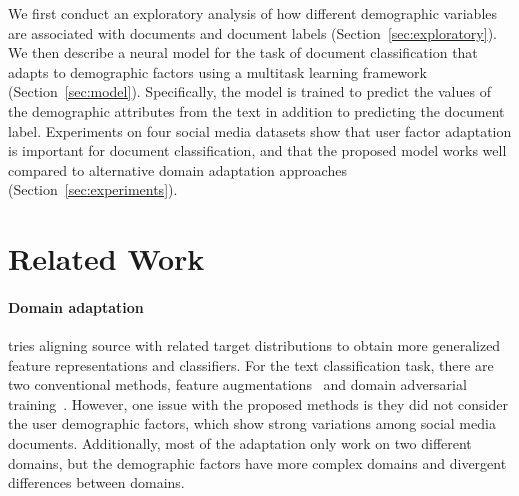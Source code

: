 We first conduct an exploratory analysis of how different demographic variables are associated with documents and document labels (Section~\ref{sec:exploratory}).
We then describe a neural model for the task of document classification that adapts to demographic factors using a multitask learning framework (Section~\ref{sec:model}). Specifically, the model is trained to predict the values of the demographic attributes from the text in addition to predicting the document label. 
Experiments on four social media datasets show that user factor adaptation is important for document classification, and that the proposed model works well compared to alternative domain adaptation approaches (Section~\ref{sec:experiments}).




\section{Related Work}

\paragraph{Domain adaptation} tries aligning source with related target distributions to obtain more generalized feature representations and classifiers. For the text classification task, there are two conventional methods, feature augmentations~\cite{daume2007frustratingly, blitzer2006domain, huang2018examining} and domain adversarial training~\cite{ganin2016domain, chen2016adversarial, liu2017adversarial}. However, one issue with the proposed methods is they did not consider the user demographic factors, which show strong variations among social media documents. Additionally, most of the adaptation only work on two different domains, but the demographic factors have more complex domains and divergent differences between domains.

